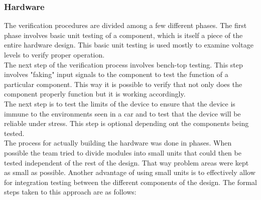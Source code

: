 \documentclass[12pt,letterpaper]{article}
\begin{document}
\subsubsection{Hardware}
The verification procedures are divided among a few different phases. The first phase involves basic unit testing of a component, which is itself a piece of the entire hardware design. This basic unit testing is used mostly to examine voltage levels to verify proper operation. \\

The next step of the verification process involves bench-top testing. This step involves "faking" input signals to the component to test the function of a particular component. This way it is possible to verify that not only does the component properly function but it is working accordingly. \\

The next step is to test the limits of the device to ensure that the device is immune to the environments seen in a car and to test that the device will be reliable under stress. This step is optional depending ont the components being tested. \\

The process for actually building the hardware was done in phases. When possible the team tried to divide modules into small units that could then be tested independent of the rest of the design. That way problem areas were kept as small as possible. Another advantage of using small units is to effectively allow for integration testing between the different components of the design. The formal steps taken to this approach are as follows:
\end{document}
